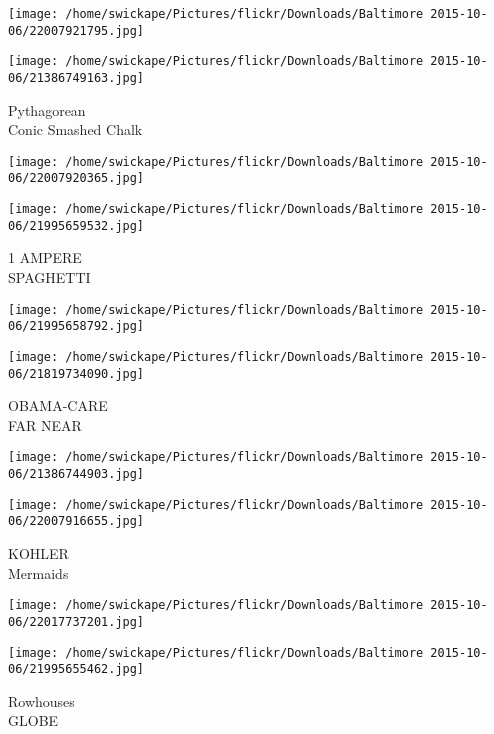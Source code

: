 \documentclass[10pt,letterpaper]{article}
\begin{document}
\texttt{[image: /home/swickape/Pictures/flickr/Downloads/Baltimore 2015-10-06/22007921795.jpg]}

\vspace{0.25in}
\texttt{[image: /home/swickape/Pictures/flickr/Downloads/Baltimore 2015-10-06/21386749163.jpg]}

Pythagorean\\
Conic Smashed Chalk\\
\pagebreak

\texttt{[image: /home/swickape/Pictures/flickr/Downloads/Baltimore 2015-10-06/22007920365.jpg]}

\vspace{0.25in}
\texttt{[image: /home/swickape/Pictures/flickr/Downloads/Baltimore 2015-10-06/21995659532.jpg]}

1 AMPERE\\
SPAGHETTI\\
\pagebreak

\texttt{[image: /home/swickape/Pictures/flickr/Downloads/Baltimore 2015-10-06/21995658792.jpg]}

\vspace{0.25in}
\texttt{[image: /home/swickape/Pictures/flickr/Downloads/Baltimore 2015-10-06/21819734090.jpg]}

OBAMA{-}CARE\\
FAR NEAR\\
\pagebreak

\texttt{[image: /home/swickape/Pictures/flickr/Downloads/Baltimore 2015-10-06/21386744903.jpg]}

\vspace{0.25in}
\texttt{[image: /home/swickape/Pictures/flickr/Downloads/Baltimore 2015-10-06/22007916655.jpg]}

KOHLER\\
Mermaids\\
\pagebreak

\texttt{[image: /home/swickape/Pictures/flickr/Downloads/Baltimore 2015-10-06/22017737201.jpg]}

\vspace{0.25in}
\texttt{[image: /home/swickape/Pictures/flickr/Downloads/Baltimore 2015-10-06/21995655462.jpg]}

Rowhouses\\
GLOBE\\
\pagebreak
\end{document}
